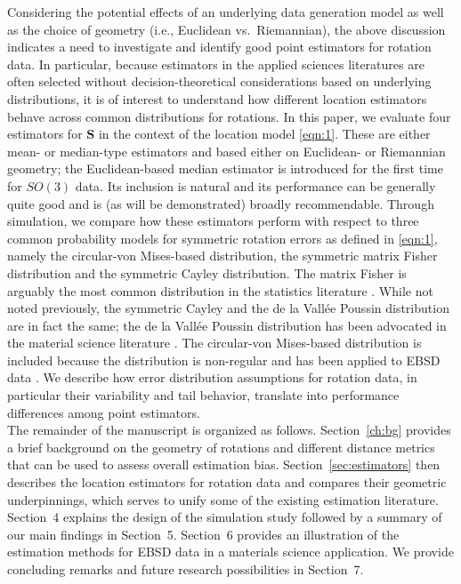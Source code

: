 Considering the potential effects of an underlying data generation model as well as the choice of geometry (i.e., Euclidean vs.~Riemannian), the above discussion indicates a need to investigate and identify good point estimators for rotation data.  In particular, because estimators in the applied sciences literatures  are often selected without decision-theoretical considerations based on underlying distributions, it is of interest to understand how different location estimators behave across common distributions for rotations.  In this paper, we evaluate four estimators for $\bm S$ in the context of the location model \eqref{eqn:1}. These are either mean- or median-type estimators and based either on Euclidean- or Riemannian geometry; the Euclidean-based median estimator is introduced for the first time for $SO(3)$ data. Its inclusion is natural and its performance can be generally quite good and is (as will be demonstrated) broadly recommendable.   Through simulation, we compare how these estimators perform with respect to three common probability models for symmetric rotation errors as defined in \eqref{eqn:1}, namely the circular-von Mises-based distribution, the symmetric matrix Fisher distribution and the symmetric Cayley distribution.  The matrix Fisher is arguably the most common distribution in the statistics literature \citep[see][]{chikuse03}. While not noted previously, the symmetric Cayley and the de la Vall\'{e}e Poussin distribution are in fact the same; the de la Vall\'{e}e Poussin distribution has been advocated in the material science literature \citep{Schaeben97}.   The circular-von Mises-based distribution is included because the distribution is non-regular and has been applied to EBSD data \citep{bingham09}.  We describe how error distribution assumptions for rotation data, in particular their variability and tail behavior, translate into performance differences among point estimators.\\

The remainder of the manuscript is organized  as follows.  Section~\ref{ch:bg} provides a brief background on the geometry of rotations and different distance metrics that can be used to assess overall estimation bias.   Section~\ref{sec:estimators} then describes the location estimators for rotation data  and compares their geometric underpinnings, which  serves to unify some of the existing estimation literature.  Section~4 explains the design of the simulation study followed by a summary of our main findings in Section~5. Section~6 provides an illustration of the estimation methods for EBSD data in a materials science application. We provide concluding remarks and future research possibilities in Section~7.
